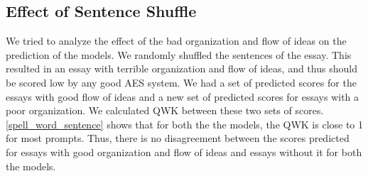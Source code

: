 \documentclass[11pt,a4paper]{article}
\begin{document}

\subsection{Effect of Sentence Shuffle}
  We tried to analyze the effect of the bad organization and flow of ideas on the prediction of the models. We randomly shuffled the sentences of the essay. This resulted in an essay with terrible organization and flow of ideas, and thus should be scored low by any good AES system. We had a set of predicted scores for the essays with good flow of ideas and a new set of predicted scores for essays with a poor organization. We calculated QWK between these two sets of scores. \cref{spell_word_sentence} shows that for both the the models, the QWK is close to 1 for most prompts. Thus, there is no disagreement between the scores predicted for essays with good organization and flow of ideas and essays without it for both the models.
\end{document}
